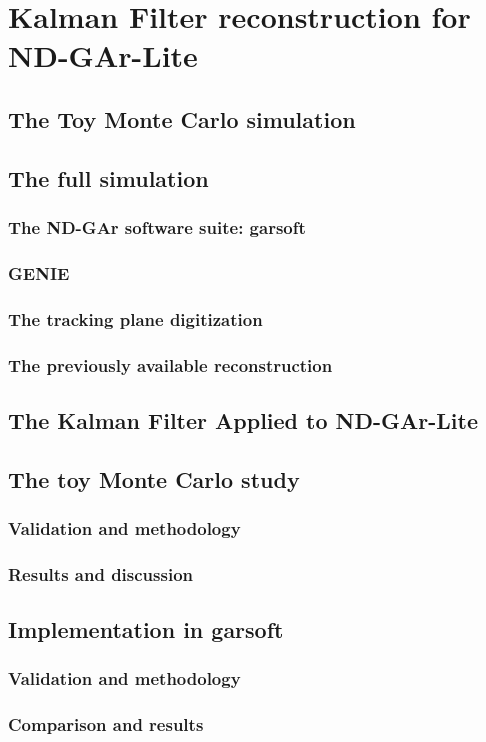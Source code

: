 \begin{savequote}[8cm]
\end{savequote}

\chapter{\label{ch:4-KF-NDGArLite}Kalman Filter reconstruction for ND-GAr-Lite}
\minitoc

\section{The Toy Monte Carlo simulation}
\section{The full simulation}
\subsection{The ND-GAr software suite: garsoft}
\subsection{GENIE}
\subsection{The tracking plane digitization}
\subsection{The previously available reconstruction}
\section{The Kalman Filter Applied to ND-GAr-Lite}
\section{The toy Monte Carlo study}
\subsection{Validation and methodology}
\subsection{Results and discussion}
\section{Implementation in garsoft}
\subsection{Validation and methodology}
\subsection{Comparison and results}